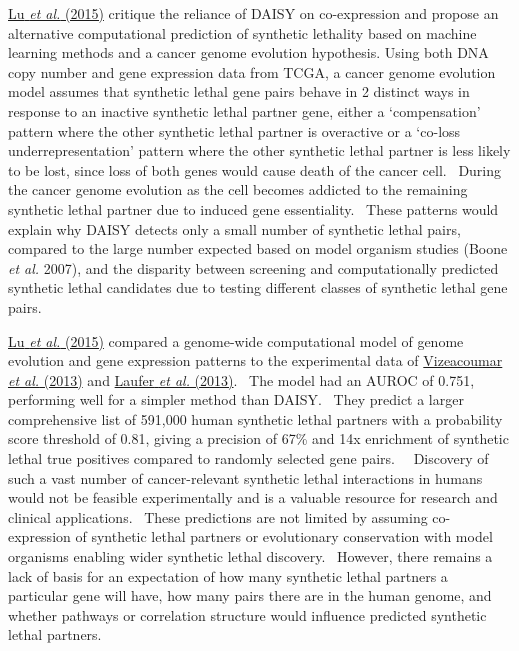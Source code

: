\hyperlink{ENREF74}{Lu}\hyperlink{ENREF74}{\textit{ et
al.}}\hyperlink{ENREF74}{ (2015)} critique the reliance of DAISY on
co-expression and propose an alternative computational prediction of
synthetic lethality based on machine learning methods and a cancer
genome evolution hypothesis. Using both DNA copy number and gene
expression data from TCGA, a cancer genome evolution model assumes that
synthetic lethal gene pairs behave in 2 distinct ways in response to an
inactive synthetic lethal partner gene, either a
{\textquoteleft}compensation{\textquoteright} pattern where the other
synthetic lethal partner is overactive or a {\textquoteleft}co-loss
underrepresentation{\textquoteright} pattern where the other synthetic
lethal partner is less likely to be lost, since loss of both genes
would cause death of the cancer cell. \ During the cancer genome
evolution as the cell becomes addicted to the remaining synthetic
lethal partner due to induced gene essentiality. \ These patterns would
explain why DAISY detects only a small number of synthetic lethal
pairs, compared to the large number expected based on model organism
studies (Boone\textit{ et al.} 2007), and the disparity between
screening and computationally predicted synthetic lethal candidates due
to testing different classes of synthetic lethal gene pairs.


\hyperlink{ENREF74}{Lu}\hyperlink{ENREF74}{\textit{ et
al.}}\hyperlink{ENREF74}{ (2015)} compared a genome-wide computational
model of genome evolution and gene expression patterns to the
experimental data of
\hyperlink{ENREF108}{Vizeacoumar}\hyperlink{ENREF108}{\textit{ et
al.}}\hyperlink{ENREF108}{ (2013)} and
\hyperlink{ENREF60}{Laufer}\hyperlink{ENREF60}{\textit{ et
al.}}\hyperlink{ENREF60}{ (2013)}. \ The model had an AUROC of 0.751,
performing well for a simpler method than DAISY. \ They predict a
larger comprehensive list of 591,000 human synthetic lethal partners
with a probability score threshold of 0.81, giving a precision of 67\%
and 14x enrichment of synthetic lethal true positives compared to
randomly selected gene pairs. \ \ Discovery of such a vast number of
cancer-relevant synthetic lethal interactions in humans would not be
feasible experimentally and is a valuable resource for research and
clinical applications. \ These predictions are not limited by assuming
co-expression of synthetic lethal partners or evolutionary conservation
with model organisms enabling wider synthetic lethal discovery.
\ However, there remains a lack of basis for an expectation of how many
synthetic lethal partners a particular gene will have, how many pairs
there are in the human genome, and whether pathways or correlation
structure would influence predicted synthetic lethal partners.


